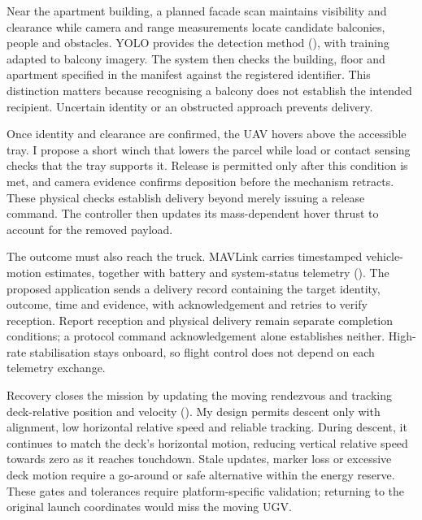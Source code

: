 Near the apartment building, a planned facade scan maintains visibility and clearance while camera and range measurements locate candidate balconies, people and obstacles. YOLO provides the detection method (\citealp{Redmon2016}), with training adapted to balcony imagery. The system then checks the building, floor and apartment specified in the manifest against the registered identifier. This distinction matters because recognising a balcony does not establish the intended recipient. Uncertain identity or an obstructed approach prevents delivery.

Once identity and clearance are confirmed, the UAV hovers above the accessible tray. I propose a short winch that lowers the parcel while load or contact sensing checks that the tray supports it. Release is permitted only after this condition is met, and camera evidence confirms deposition before the mechanism retracts. These physical checks establish delivery beyond merely issuing a release command. The controller then updates its mass-dependent hover thrust to account for the removed payload.

The outcome must also reach the truck. MAVLink carries timestamped vehicle-motion estimates, together with battery and system-status telemetry (\citealp{MAVLink}). The proposed application sends a delivery record containing the target identity, outcome, time and evidence, with acknowledgement and retries to verify reception. Report reception and physical delivery remain separate completion conditions; a protocol command acknowledgement alone establishes neither. High-rate stabilisation stays onboard, so flight control does not depend on each telemetry exchange.

Recovery closes the mission by updating the moving rendezvous and tracking deck-relative position and velocity (\citealp{Borowczyk2017}). My design permits descent only with alignment, low horizontal relative speed and reliable tracking. During descent, it continues to match the deck's horizontal motion, reducing vertical relative speed towards zero as it reaches touchdown. Stale updates, marker loss or excessive deck motion require a go-around or safe alternative within the energy reserve. These gates and tolerances require platform-specific validation; returning to the original launch coordinates would miss the moving UGV.


\begin{table}[htbp]
\centering
\caption{Module-to-method mapping for the proposed delivery design. Sources for the named methods appear in the main text; delivery interlocks and integration rules are proposed choices.}
\label{tab:modules}
\end{table}

